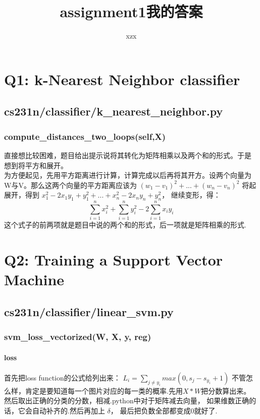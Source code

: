 \documentclass[fontset = none]{ctexart}
\author{\CJKfontspec{KaiTi} xzx}
\title{assignment1我的答案}
\begin{document}
\maketitle
\setcounter{page}{0}
\thispagestyle{empty}
\newpage

\section{Q1: k-Nearest Neighbor classifier}

\subsection{cs231n/classifier/k\_nearest\_neighbor.py}
\subsubsection{compute\_distances\_two\_loops(self,X) }
直接想比较困难，题目给出提示说将其转化为矩阵相乘以及两个和的形式。于是
想到将平方和展开。\\
为方便起见，先用平方距离进行计算，计算完成以后再将其开方。设两个向量为
W与V。那么这两个向量的平方距离应该为 $(w_1 - v_1)^2 + ... + (w_n-v_n)^2$
将起展开，得到 $x_1^2-2x_{1}y_1+y_1^2 + ... +x_n^2-2x_{n}y_n+y_n^2$，
继续变形，得：
$$\sum_{i=1}^{n}{x_i^2} +
\sum_{i=1}^{n}{y_i^2} -2\sum_{i=1}^n{x_{i}y_i}$$
这个式子的前两项就是题目中说的两个和的形式，后一项就是矩阵相乘的形式.

\section{Q2: Training a Support Vector Machine}

\subsection{cs231n/classifier/linear\_svm.py}
\subsubsection{svm\_loss\_vectorized(W, X, y, reg)}
\paragraph{loss}
首先把loss function的公式给列出来：
 $L_i = \sum_{j\neq y_i}max(0, s_j - s_{y_i} + 1)$
不管怎么样，肯定是要知道每一个图片对应的每一类的概率.先用$X * W$把分数算出来。\\
然后取出正确的分类的分数，相减.python中对于矩阵减去向量，
如果维数正确的话，它会自动补齐的.然后再加上 $\delta$，
最后把负数全部都变成0就好了.
\end{document}
